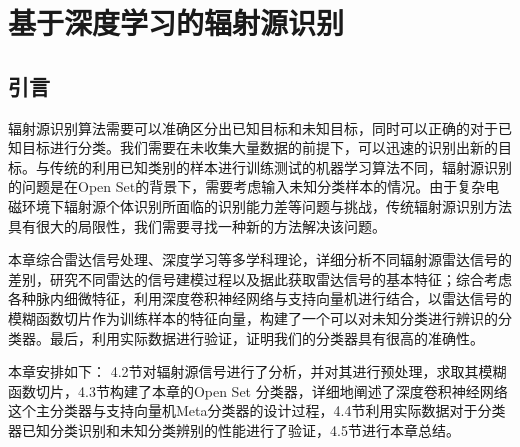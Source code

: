 \chapter{基于深度学习的辐射源识别}




\section{引言}

辐射源识别算法需要可以准确区分出已知目标和未知目标，同时可以正确的对于已知目标进行分类。我们需要在未收集大量数据的前提下，可以迅速的识别出新的目标。与传统的利用已知类别的样本进行训练测试的机器学习算法不同，辐射源识别的问题是在Open Set的背景下，需要考虑输入未知分类样本的情况。由于复杂电磁环境下辐射源个体识别所面临的识别能力差等问题与挑战，传统辐射源识别方法具有很大的局限性，我们需要寻找一种新的方法解决该问题。

本章综合雷达信号处理、深度学习等多学科理论，详细分析不同辐射源雷达信号的差别，研究不同雷达的信号建模过程以及据此获取雷达信号的基本特征；综合考虑各种脉内细微特征，利用深度卷积神经网络与支持向量机进行结合，以雷达信号的模糊函数切片作为训练样本的特征向量，构建了一个可以对未知分类进行辨识的分类器。最后，利用实际数据进行验证，证明我们的分类器具有很高的准确性。

本章安排如下： 4.2节对辐射源信号进行了分析，并对其进行预处理，求取其模糊函数切片，4.3节构建了本章的Open Set 分类器，详细地阐述了深度卷积神经网络这个主分类器与支持向量机Meta分类器的设计过程，4.4节利用实际数据对于分类器已知分类识别和未知分类辨别的性能进行了验证，4.5节进行本章总结。



